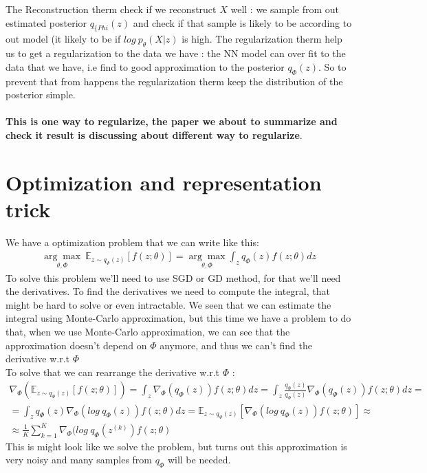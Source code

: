 The Reconstruction therm check if we reconstruct $X$ well : we sample from out estimated posterior $q_{\{Phi}(z)$ and check if that sample is likely to be according to out model (it likely to be if $log \ p_{\theta}(X|z)$ is high. The regularization therm help us to get a regularization to the data we have : the NN model can over fit to the data that we have, i.e find to good approximation to the posterior $q_{\Phi}(z)$. So to prevent that from happens the regularization therm keep the distribution of the posterior simple. \\ \\ \textbf{This is one way to regularize, the paper we about to summarize and check it result is discussing about different way to regularize}.    

\section*{Optimization and representation trick}
We have a optimization problem that we can write like this:
\begin{gather*}
\underset{\theta, \Phi}{\arg\max} \ \mathbb{E}_{z \sim q_{\Phi}(z)}[f(z;\theta)] = \underset{\theta, \Phi}{\arg\max} \int_{z} q_{\Phi}(z)f(z;\theta)dz
\end{gather*}
To solve this problem we'll need to use SGD or GD method, for that we'll need the derivatives. To find the derivatives we need to compute the integral, that might be hard to solve or even intractable. We seen that we can estimate the integral using Monte-Carlo approximation, but this time we have a problem to do that, when we use Monte-Carlo approximation, we can see that the approximation doesn't depend on $\Phi$ anymore, and thus we can't find the derivative w.r.t $\Phi$ \\
To solve that we can rearrange the derivative w.r.t $\Phi$ :
\begin{gather*}
\nabla_{\Phi} (\mathbb{E}_{z \sim q_{\Phi}(z)}[f(z;\theta)]) =  \int_{z} \nabla_{\Phi}(q_{\Phi}(z))f(z;\theta)dz = \int_{z} \frac{q_{\Phi}(z)}{q_{\Phi}(z)}\nabla_{\Phi}(q_{\Phi}(z))f(z;\theta)dz = \\
= \int_{z} q_{\Phi}(z)\nabla_{\Phi}(log \ q_{\Phi}(z))f(z;\theta)dz = \mathbb{E}_{z \sim q_{\Phi}(z)}[\nabla_{\Phi}(log \ q_{\Phi}(z))f(z;\theta)] \approx \\ \approx \frac{1}{K}\sum_{k=1}^{K}\nabla_{\Phi}(log \ q_{\Phi}(z^{(k)})f(z;\theta)
\end{gather*}
This is might look like we solve the problem, but turns out this approximation is very noisy and many samples from $q_{\Phi}$ will be needed. \\
